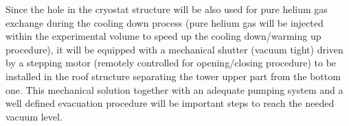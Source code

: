 Since the hole in the cryostat structure will be also used for pure helium gas exchange during the cooling down process (pure helium gas will be injected within the experimental volume to speed up the cooling down/warming up procedure), it will be equipped with a mechanical shutter (vacuum tight) driven by a stepping motor (remotely controlled for opening/closing procedure) to be installed in the roof structure separating the tower upper part from the bottom one. This mechanical solution together with an adequate pumping system and a well defined evacuation procedure will be important steps to reach the needed vacuum level. 

